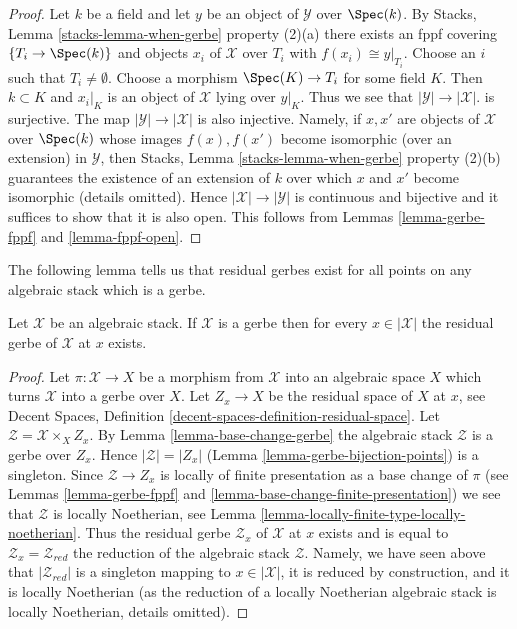 \begin{proof}
Let $k$ be a field and let $y$ be an object
of $\mathcal{Y}$ over $\Spec(k)$. By
Stacks, Lemma \ref{stacks-lemma-when-gerbe} property (2)(a)
there exists an fppf covering $\{T_i \to \Spec(k)\}$
and objects $x_i$ of $\mathcal{X}$ over $T_i$ with $f(x_i) \cong y|_{T_i}$.
Choose an $i$ such that $T_i \not = \emptyset$. Choose a
morphism $\Spec(K) \to T_i$ for some field $K$.
Then $k \subset K$ and $x_i|_K$ is an object of $\mathcal{X}$ lying
over $y|_K$. Thus we see that
$|\mathcal{Y}| \to |\mathcal{X}|$. is surjective. The map
$|\mathcal{Y}| \to |\mathcal{X}|$ is also injective. Namely, if
$x, x'$ are objects of $\mathcal{X}$ over $\Spec(k)$ whose images
$f(x), f(x')$ become isomorphic (over an extension) in $\mathcal{Y}$, then
Stacks, Lemma \ref{stacks-lemma-when-gerbe} property (2)(b)
guarantees the existence of an extension of $k$ over which $x$ and $x'$
become isomorphic (details omitted).
Hence $|\mathcal{X}| \to |\mathcal{Y}|$ is continuous and bijective
and it suffices to show that it is also open.
This follows from
Lemmas \ref{lemma-gerbe-fppf} and \ref{lemma-fppf-open}.
\end{proof}

\noindent
The following lemma tells us that residual gerbes exist for all points
on any algebraic stack which is a gerbe.

\begin{lemma}
\label{lemma-gerbe-residual-gerbe-exists}
Let $\mathcal{X}$ be an algebraic stack. If $\mathcal{X}$ is a gerbe
then for every $x \in |\mathcal{X}|$ the residual gerbe of $\mathcal{X}$
at $x$ exists.
\end{lemma}

\begin{proof}
Let $\pi : \mathcal{X} \to X$ be a morphism from $\mathcal{X}$ into
an algebraic space $X$ which turns $\mathcal{X}$ into a gerbe over $X$.
Let $Z_x \to X$ be the residual space of $X$ at $x$, see
Decent Spaces, Definition \ref{decent-spaces-definition-residual-space}.
Let $\mathcal{Z} = \mathcal{X} \times_X Z_x$. By
Lemma \ref{lemma-base-change-gerbe}
the algebraic stack $\mathcal{Z}$ is a gerbe over $Z_x$.
Hence $|\mathcal{Z}| = |Z_x|$
(Lemma \ref{lemma-gerbe-bijection-points})
is a singleton. Since $\mathcal{Z} \to Z_x$ is locally of finite presentation
as a base change of $\pi$ (see
Lemmas \ref{lemma-gerbe-fppf} and \ref{lemma-base-change-finite-presentation})
we see that $\mathcal{Z}$ is locally Noetherian, see
Lemma \ref{lemma-locally-finite-type-locally-noetherian}.
Thus the residual gerbe $\mathcal{Z}_x$ of $\mathcal{X}$ at $x$
exists and is equal to $\mathcal{Z}_x = \mathcal{Z}_{red}$ the reduction
of the algebraic stack $\mathcal{Z}$. Namely, we have seen above
that $|\mathcal{Z}_{red}|$ is a singleton mapping to $x \in |\mathcal{X}|$,
it is reduced by construction, and it is locally Noetherian (as the
reduction of a locally Noetherian algebraic stack is locally Noetherian,
details omitted).
\end{proof}









